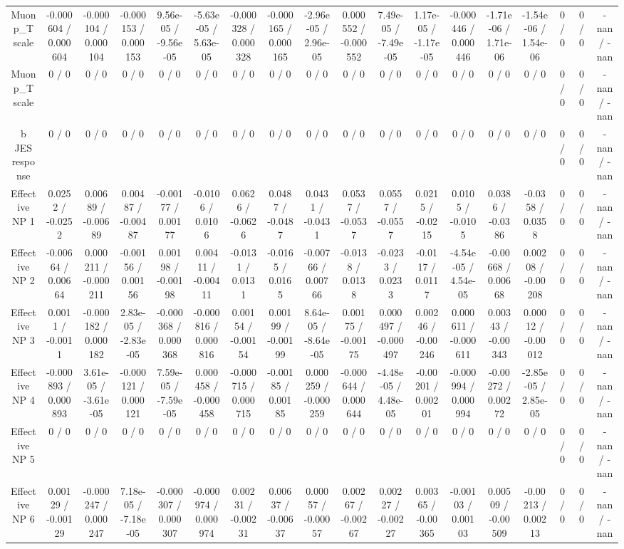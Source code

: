 \documentclass[10pt]{article}
\begin{document}
\begin{table}[htbp]
\begin{center}
\begin{tabular}{|c|c|c|c|c|c|c|c|c|c|c|c|c|c|c|c|c|c|}
  Muon p_{T} scale & -0.000604 / 0.000604 & -0.000104 / 0.000104 & -0.000153 / 0.000153 & 9.56e-05 / -9.56e-05 & -5.63e-05 / 5.63e-05 & -0.000328 / 0.000328 & -0.000165 / 0.000165 & -2.96e-05 / 2.96e-05 & 0.000552 / -0.000552 & 7.49e-05 / -7.49e-05 & 1.17e-05 / -1.17e-05 & -0.000446 / 0.000446 & -1.71e-06 / 1.71e-06 & -1.54e-06 / 1.54e-06 & 0 / 0 & 0 / 0 & -nan / -nan \\ 
  Muon p_{T} scale & 0 / 0 & 0 / 0 & 0 / 0 & 0 / 0 & 0 / 0 & 0 / 0 & 0 / 0 & 0 / 0 & 0 / 0 & 0 / 0 & 0 / 0 & 0 / 0 & 0 / 0 & 0 / 0 & 0 / 0 & 0 / 0 & -nan / -nan \\ 
  b JES response & 0 / 0 & 0 / 0 & 0 / 0 & 0 / 0 & 0 / 0 & 0 / 0 & 0 / 0 & 0 / 0 & 0 / 0 & 0 / 0 & 0 / 0 & 0 / 0 & 0 / 0 & 0 / 0 & 0 / 0 & 0 / 0 & -nan / -nan \\ 
  Effective NP 1 & 0.0252 / -0.0252 & 0.00689 / -0.00689 & 0.00487 / -0.00487 & -0.00177 / 0.00177 & -0.0106 / 0.0106 & 0.0626 / -0.0626 & 0.0487 / -0.0487 & 0.0431 / -0.0431 & 0.0537 / -0.0537 & 0.0557 / -0.0557 & 0.0215 / -0.0215 & 0.0105 / -0.0105 & 0.0386 / -0.0386 & -0.0358 / 0.0358 & 0 / 0 & 0 / 0 & -nan / -nan \\ 
  Effective NP 2 & -0.00664 / 0.00664 & 0.000211 / -0.000211 & -0.00156 / 0.00156 & 0.00198 / -0.00198 & 0.00411 / -0.00411 & -0.0131 / 0.0131 & -0.0165 / 0.0165 & -0.00766 / 0.00766 & -0.0138 / 0.0138 & -0.0233 / 0.0233 & -0.0117 / 0.0117 & -4.54e-05 / 4.54e-05 & -0.00668 / 0.00668 & 0.00208 / -0.00208 & 0 / 0 & 0 / 0 & -nan / -nan \\ 
  Effective NP 3 & 0.0011 / -0.0011 & -0.000182 / 0.000182 & 2.83e-05 / -2.83e-05 & -0.000368 / 0.000368 & -0.000816 / 0.000816 & 0.00154 / -0.00154 & 0.00199 / -0.00199 & 8.64e-05 / -8.64e-05 & 0.00175 / -0.00175 & 0.000497 / -0.000497 & 0.00246 / -0.00246 & 0.000611 / -0.000611 & 0.00343 / -0.00343 & 0.00012 / -0.00012 & 0 / 0 & 0 / 0 & -nan / -nan \\ 
  Effective NP 4 & -0.000893 / 0.000893 & 3.61e-05 / -3.61e-05 & -0.000121 / 0.000121 & 7.59e-05 / -7.59e-05 & 0.000458 / -0.000458 & -0.000715 / 0.000715 & -0.00185 / 0.00185 & 0.000259 / -0.000259 & -0.000644 / 0.000644 & -4.48e-05 / 4.48e-05 & -0.00201 / 0.00201 & -0.000994 / 0.000994 & -0.00272 / 0.00272 & -2.85e-05 / 2.85e-05 & 0 / 0 & 0 / 0 & -nan / -nan \\ 
  Effective NP 5 & 0 / 0 & 0 / 0 & 0 / 0 & 0 / 0 & 0 / 0 & 0 / 0 & 0 / 0 & 0 / 0 & 0 / 0 & 0 / 0 & 0 / 0 & 0 / 0 & 0 / 0 & 0 / 0 & 0 / 0 & 0 / 0 & -nan / -nan \\ 
  Effective NP 6 & 0.00129 / -0.00129 & -0.000247 / 0.000247 & 7.18e-05 / -7.18e-05 & -0.000307 / 0.000307 & -0.000974 / 0.000974 & 0.00231 / -0.00231 & 0.00637 / -0.00637 & 0.00057 / -0.00057 & 0.00267 / -0.00267 & 0.00227 / -0.00227 & 0.00365 / -0.00365 & -0.00103 / 0.00103 & 0.00509 / -0.00509 & -0.00213 / 0.00213 & 0 / 0 & 0 / 0 & -nan / -nan \\ 

\end{tabular}
\end{center}
\end{table}
\end{document}
